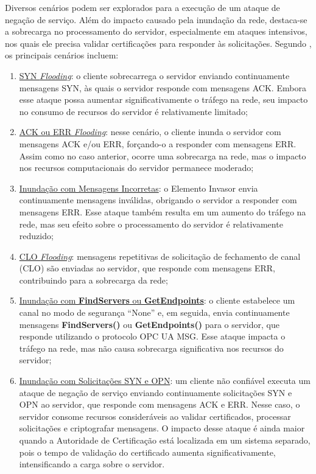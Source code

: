        Diversos cenários podem ser explorados para a execução de um ataque de negação de serviço. Além do impacto causado pela inundação da rede, destaca-se a sobrecarga no processamento do servidor, especialmente em ataques intensivos, nos quais ele precisa validar certificações para responder às solicitações. Segundo , os principais cenários incluem:

        \begin{enumerate}
            \item \underline{SYN \textit{Flooding}}: o cliente sobrecarrega o servidor enviando continuamente mensagens SYN, às quais o servidor responde com mensagens ACK. Embora esse ataque possa aumentar significativamente o tráfego na rede, seu impacto no consumo de recursos do servidor é relativamente limitado;
            \item \underline{ACK ou ERR \textit{Flooding}}: nesse cenário, o cliente inunda o servidor com mensagens ACK e/ou ERR, forçando-o a responder com mensagens ERR. Assim como no caso anterior, ocorre uma sobrecarga na rede, mas o impacto nos recursos computacionais do servidor permanece moderado;
            \item \underline{Inundação com Mensagens Incorretas}: o Elemento Invasor envia continuamente mensagens inválidas, obrigando o servidor a responder com mensagens ERR. Esse ataque também resulta em um aumento do tráfego na rede, mas seu efeito sobre o processamento do servidor é relativamente reduzido;
            \item \underline{CLO \textit{Flooding}}: mensagens repetitivas de solicitação de fechamento de canal (CLO) são enviadas ao servidor, que responde com mensagens ERR, contribuindo para a sobrecarga da rede;
            \item \underline{Inundação com \textbf{FindServers} ou \textbf{GetEndpoints}}: o cliente estabelece um canal no modo de segurança ``None'' e, em seguida, envia continuamente mensagens \textbf{FindServers()} ou \textbf{GetEndpoints()} para o servidor, que responde utilizando o protocolo OPC UA MSG. Esse ataque impacta o tráfego na rede, mas não causa sobrecarga significativa nos recursos do servidor;
            \item \underline{Inundação com Solicitações SYN e OPN}: um cliente não confiável executa um ataque de negação de serviço enviando continuamente solicitações SYN e OPN ao servidor, que responde com mensagens ACK e ERR. Nesse caso, o servidor consome recursos consideráveis ao validar certificados, processar solicitações e criptografar mensagens. O impacto desse ataque é ainda maior quando a Autoridade de Certificação está localizada em um sistema separado, pois o tempo de validação do certificado aumenta significativamente, intensificando a carga sobre o servidor.
        \end{enumerate}

